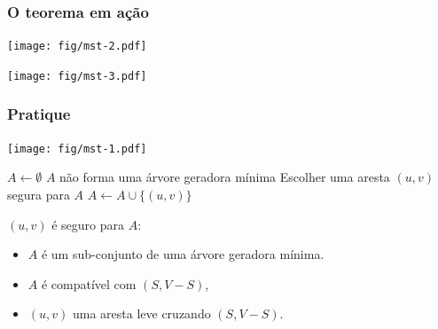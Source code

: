 \documentclass{beamer}
\begin{document}
\begin{frame}
\frametitle{O teorema em ação}

\begin{center}
\texttt{[image: fig/mst-2.pdf]}
\end{center}

\begin{center}
\texttt{[image: fig/mst-3.pdf]}
\end{center}

\end{frame}

\begin{frame}
\frametitle{Pratique}
\begin{center}
\texttt{[image: fig/mst-1.pdf]}
\end{center}
\begin{codebox}
\zi $A \gets \emptyset$
\zi \While $A$ não forma uma árvore geradora mínima
\zi \Do Escolher uma aresta $(u, v)$ segura para $A$
\zi   $A \gets A \cup \{ (u, v) \}$
    \End
\end{codebox}

$(u, v)$ é seguro para $A$:
\begin{itemize}
\item $A$ é um sub-conjunto de uma árvore geradora mínima. 
\item $A$ é compatível com $(S, V-S)$, 
\item $(u, v)$ uma aresta leve cruzando $(S, V-S)$. 
\end{itemize}

\end{frame}
\end{document}
